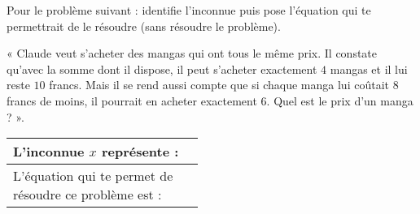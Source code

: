 \medskip

Pour le problème suivant : identifie l’inconnue puis pose l’équation qui te permettrait de le résoudre
(sans résoudre le problème).

« Claude veut s’acheter des mangas qui ont tous le même prix. Il constate qu’avec la somme dont
il dispose, il peut s’acheter exactement $4$ mangas et il lui reste $10$ francs. Mais il se rend aussi
compte que si chaque manga lui coûtait $8$ francs de moins, il pourrait en acheter exactement $6$.
Quel est le prix d’un manga ? ».

\medskip
\setlength{\extrarowheight}{10pt}
\begin{tabularx}{\textwidth}{|X|X|}\hline
    \makecell[l]{L'inconnue $x$ représente :\\\phantom{test}}& \\\hline
    \makecell[l]{L’équation qui te permet de\\
résoudre ce problème est :} & \\\hline
\end{tabularx}
